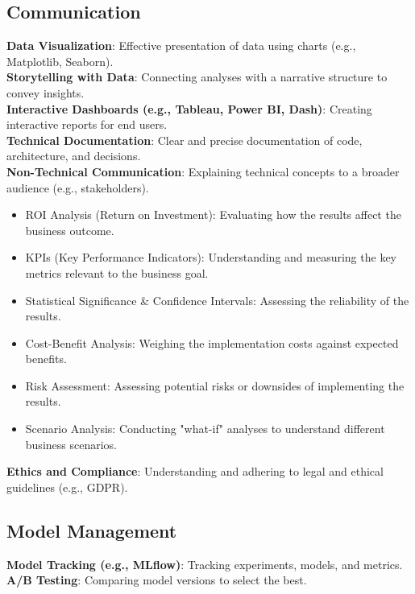 \documentclass[english]{latex4ei/latex4ei_sheet}
\begin{document}
\begin{sectionbox}
\subsection{Communication}
    \textbf{Data Visualization}: Effective presentation of data using charts (e.g., Matplotlib, Seaborn).\\
    \textbf{Storytelling with Data}: Connecting analyses with a narrative structure to convey insights.\\
    \textbf{Interactive Dashboards (e.g., Tableau, Power BI, Dash)}: Creating interactive reports for end users.\\
    \textbf{Technical Documentation}: Clear and precise documentation of code, architecture, and decisions.\\
    \textbf{Non-Technical Communication}: Explaining technical concepts to a broader audience (e.g., stakeholders).\\
        \begin{itemize}
            \item ROI Analysis (Return on Investment): Evaluating how the results affect the business outcome.
            \item KPIs (Key Performance Indicators): Understanding and measuring the key metrics relevant to the business goal.
            \item Statistical Significance \& Confidence Intervals: Assessing the reliability of the results.
            \item Cost-Benefit Analysis: Weighing the implementation costs against expected benefits.
            \item Risk Assessment: Assessing potential risks or downsides of implementing the results.
            \item Scenario Analysis: Conducting "what-if" analyses to understand different business scenarios.
        \end{itemize}
    \textbf{Ethics and Compliance}: Understanding and adhering to legal and ethical guidelines (e.g., GDPR).
    
\subsection{Model Management}
    \textbf{Model Tracking (e.g., MLflow)}: Tracking experiments, models, and metrics.\\
    \textbf{A/B Testing}: Comparing model versions to select the best.\\
\end{sectionbox}
\end{document}
